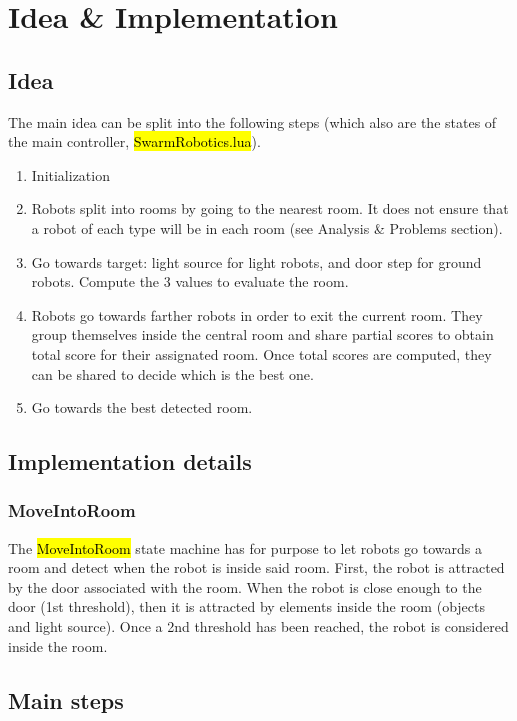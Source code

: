\section{Idea \& Implementation}

\subsection{Idea}

\noindent The main idea can be split into the following steps (which also are
the states of the main controller, \hl{SwarmRobotics.lua}).

\begin{enumerate}
    \item Initialization
    \item Robots split into rooms by going to the nearest room. It does not
    ensure that a robot of each type will be in each room (see Analysis \&
    Problems section).
    \item Go towards target: light source for light robots, and door step for
    ground robots. Compute the 3 values to evaluate the room.
    \item Robots go towards farther robots in order to exit the current room.
    They group themselves inside the central room and share partial scores to
    obtain total score for their assignated room. Once total scores are computed,
    they can be shared to decide which is the best one.
    \item Go towards the best detected room.
\end{enumerate}

\subsection{Implementation details}


\subsubsection{MoveIntoRoom}

The \hl{MoveIntoRoom} state machine has for purpose to let robots go towards
a room and detect when the robot is inside said room. First, the robot is
attracted by the door associated with the room. When the robot is close enough
to the door (1st threshold), then it is attracted by elements inside the room
(objects and light source). Once a 2nd threshold has been reached, the robot is
considered inside the room.

\subsection{Main steps}

